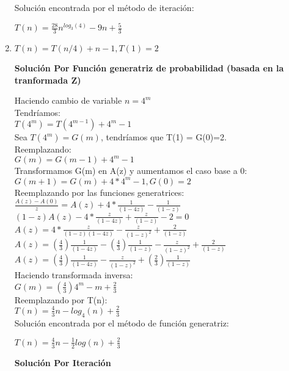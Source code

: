 \documentclass{article}
\begin{document}
\begin{enumerate}[label=\textbf{\alph*.}]
  Soluci\'on encontrada por el m\'etodo de iteración:
  \begin{center}
  	$T(n) =  \frac{28}{3}n^{log_3(4)} - 9n  + \frac{5}{3} $\\
  \end{center}
  
  \item $T(n)=T(n/4)+n-1, T(1)=2$
  
  \textbf{Soluci\'on Por Funci\'on generatriz de probabilidad (basada en la tranformada Z)}
  
  Haciendo cambio de variable $n=4^m$\\
  Tendríamos:\\
  $T(4^m)=T(4^{m-1})+4^m-1$\\
  Sea $T(4^m) = G(m)$, tendríamos que T(1) = G(0)=2.\\
  Reemplazando:\\
  $G(m)=G(m-1)+4^m-1$\\
  Transformamos G(m) en A(z) y aumentamos el caso base a 0:\\
  $G(m+1)=G(m)+4*4^{m}-1, G(0)=2$\\
  
  Reemplazando por las funciones generatrices:\\
  $\frac{A(z) - A(0)}{z} = A(z) + 4*\frac{1}{(1-4z)} -\frac{1}{(1-z)}$\\
  $(1-z)A(z) - 4*\frac{z}{(1-4z)} + \frac{z}{(1-z)} - 2=0$\\
  $A(z) = 4*\frac{z}{(1-z)(1-4z)} - \frac{z}{(1-z)^2} + \frac{2}{(1-z)}$\\
  $A(z) = (\frac{4}{3})\frac{1}{(1-4z)} - (\frac{4}{3})\frac{1}{(1-z)} - \frac{z}{(1-z)^2} + \frac{2}{(1-z)}$\\
  $A(z) = (\frac{4}{3})\frac{1}{(1-4z)} - \frac{z}{(1-z)^2} + (\frac{2}{3})\frac{1}{(1-z)}$\\
  Haciendo transformada inversa:\\
  $G(m) = (\frac{4}{3})4^m - m + \frac{2}{3}$\\
  Reemplazando por T(n):\\
  $T(n) = \frac{4}{3}n - log_4(n) + \frac{2}{3}$\\
  
  Soluci\'on encontrada por el m\'etodo de función generatriz:
  \begin{center}
  	$T(n) = \frac{4}{3}n - \frac{1}{2}log(n) + \frac{2}{3}$\\
  \end{center}
  
  \textbf{Soluci\'on Por Iteraci\'on}
  

\end{enumerate}
\end{document}
